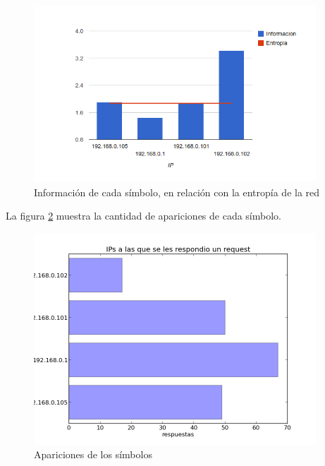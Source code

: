 \documentclass{article}
\begin{document}
\begin{figure}[h!]
    \centering                                                       
    \includegraphics[width=300pt]{red2/respondidas2.png}
    \caption{Información de cada símbolo, en relación con la
        entropía de la red}
    \label{fig:red2replied:infoentro}
\end{figure}

La figura \ref{fig:red2replied:count} muestra la cantidad de apariciones de
cada símbolo.

\begin{figure}[h!]
    \centering
    \includegraphics[width=300pt]{red2/red2replied.png}
    \caption{Apariciones de los símbolos}
    \label{fig:red2replied:count}
\end{figure}


\newpage
\end{document}
